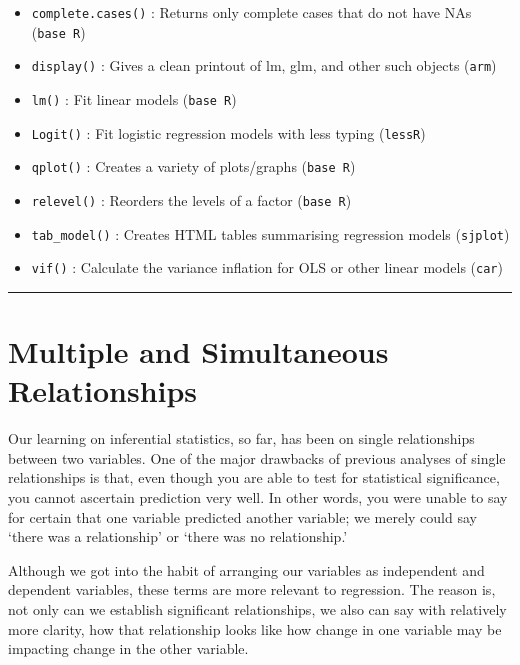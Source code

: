 \documentclass[
]{book}
\providecommand{\tightlist}{%
  \setlength{\itemsep}{0pt}\setlength{\parskip}{0pt}}
\begin{document}
\begin{itemize}
\tightlist
\item
  \texttt{complete.cases()} : Returns only complete cases that do not have NAs (\texttt{base\ R})
\item
  \texttt{display()} : Gives a clean printout of lm, glm, and other such objects (\texttt{arm})
\item
  \texttt{lm()} : Fit linear models (\texttt{base\ R})
\item
  \texttt{Logit()} : Fit logistic regression models with less typing (\texttt{lessR})
\item
  \texttt{qplot()} : Creates a variety of plots/graphs (\texttt{base\ R})
\item
  \texttt{relevel()} : Reorders the levels of a factor (\texttt{base\ R})
\item
  \texttt{tab\_model()} : Creates HTML tables summarising regression models (\texttt{sjplot})
\item
  \texttt{vif()} : Calculate the variance inflation for OLS or other linear models (\texttt{car})
\end{itemize}

\begin{center}\rule{0.5\linewidth}{0.5pt}\end{center}

\hypertarget{multiple-and-simultaneous-relationships}{%
\section{Multiple and Simultaneous Relationships}\label{multiple-and-simultaneous-relationships}}

Our learning on inferential statistics, so far, has been on single relationships between two variables. One of the major drawbacks of previous analyses of single relationships is that, even though you are able to test for statistical significance, you cannot ascertain prediction very well. In other words, you were unable to say for certain that one variable predicted another variable; we merely could say `there was a relationship' or `there was no relationship.'

Although we got into the habit of arranging our variables as independent and dependent variables, these terms are more relevant to regression. The reason is, not only can we establish significant relationships, we also can say with relatively more clarity, how that relationship looks like how change in one variable may be impacting change in the other variable.
\end{document}
